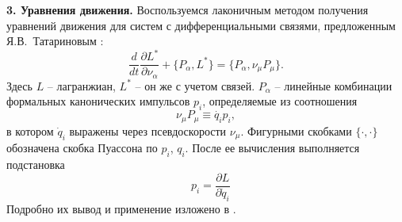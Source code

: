 {\bf 3. Уравнения движения.}
Воспользуемся лаконичным методом получения уравнений движения для систем с дифференциальными связями, предложенным Я.В.~Татариновым \cite{Tatarinov}:
\begin{equation}\label{Tatarinov}
    \frac{d}{dt}\frac{\partial L^{*}}{\partial \nu_\alpha}  + \{P_\alpha, L^{*}\} = \{P_\alpha, \nu_\mu P_\mu\}.
\end{equation}
Здесь $L$ -- лагранжиан, $L^*$ -- он же с учетом связей. $P_\alpha$ -- линейные комбинации формальных канонических импульсов $p_i$, определяемые из соотношения 
$$\nu_\mu P_\mu \equiv \dot{q_i} p_i,$$
 в котором $\dot{q}_i$ выражены через псевдоскорости $\nu_\mu$. Фигурными скобками $\{\cdot, \cdot\}$ обозначена скобка Пуассона по $p_i$, $q_i$. После ее вычисления выполняется подстановка 
$$\hspace{10pt} p_i = \frac{\partial L}{\partial \dot{q}_i}$$
Подробно их вывод и применение изложено в \cite{Tatarinov,Zobova2011,Zobova_ND}.

